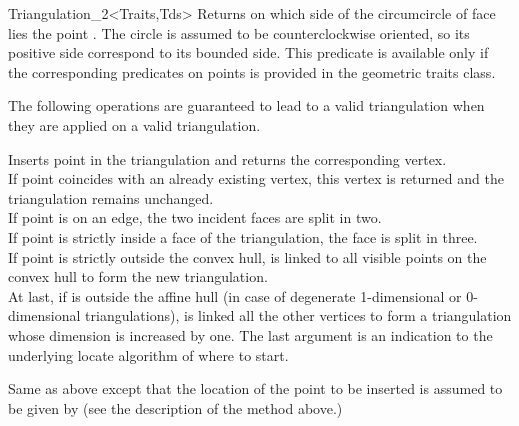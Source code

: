 \begin{ccRefClass}{Triangulation_2<Traits,Tds>}
{Returns on which side of the circumcircle  of face  lies 
the point . The circle is assumed to be counterclockwise
oriented, so its positive
side correspond to its bounded side.
This predicate is available only if the corresponding predicates on
points is provided in the geometric traits class.}


The following operations are guaranteed to lead to a valid triangulation 
when they are applied on a valid triangulation.




{Inserts point  in the triangulation and returns the corresponding
 vertex.\\
If point  coincides with an already existing vertex, this 
vertex is returned and the triangulation remains unchanged.\\
If point  is on an edge, the two incident faces are split 
in two.\\
If point  is strictly inside a face of the triangulation,
the face is split in three.\\
If point  is strictly outside the  convex hull,  is linked
to all visible points on the convex hull to form the new
triangulation.\\
At last, if  is outside the affine hull (in case of degenerate
1-dimensional or 0-dimensional triangulations), 
is linked all the  other vertices to form a triangulation whose
dimension is increased by one.
The last argument  is an indication to the underlying locate
algorithm of where to start.
}


{Same as above except that the location of the point
  to be inserted is assumed to be given by
 (see the description of the  method above.)}


\end{ccRefClass}
